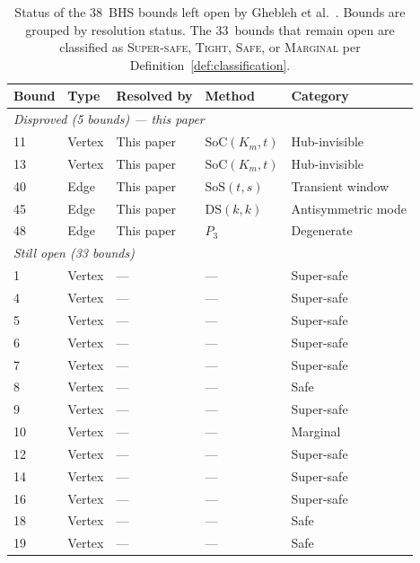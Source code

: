\documentclass[preprint,12pt]{elsarticle}
\theoremstyle{definition}
\theoremstyle{remark}
\newcommand{\SoC}{\mathrm{SoC}}       %
\newcommand{\SoS}{\mathrm{SoS}}       %
\newcommand{\DS}{\mathrm{DS}}          %
\begin{document}
\begin{table}[ht]
  \centering
  \caption{Status of the 38~BHS bounds left open by Ghebleh et
    al.~\cite{Ghebleh2024}.
    Bounds are grouped by resolution status.
    The 33~bounds that remain open are classified as
    \textsc{Super-safe}, \textsc{Tight}, \textsc{Safe}, or
    \textsc{Marginal} per Definition~\ref{def:classification}.}
  \label{tab:classification}
  {\small\renewcommand{\arraystretch}{0.88}%
  \begin{tabular}{lllll}
    \toprule
    Bound & Type & Resolved by & Method & Category \\
    \midrule
    \multicolumn{5}{l}{\emph{Disproved (5 bounds) --- this paper}} \\
    11  & Vertex & This paper & $\SoC(K_m, t)$    & Hub-invisible \\
    13  & Vertex & This paper & $\SoC(K_m, t)$    & Hub-invisible \\
    40  & Edge   & This paper & $\SoS(t, s)$      & Transient window \\
    45  & Edge   & This paper & $\DS(k, k)$       & Antisymmetric mode \\
    48  & Edge   & This paper & $P_3$             & Degenerate \\
    \midrule
    \multicolumn{5}{l}{\emph{Still open (33 bounds)}} \\
    1   & Vertex & ---         & --- & Super-safe \\
    4   & Vertex & ---         & --- & Super-safe \\
    5   & Vertex & ---         & --- & Super-safe \\
    6   & Vertex & ---         & --- & Super-safe \\
    7   & Vertex & ---         & --- & Super-safe \\
    8   & Vertex & ---         & --- & Safe \\
    9   & Vertex & ---         & --- & Super-safe \\
    10  & Vertex & ---         & --- & Marginal \\
    12  & Vertex & ---         & --- & Super-safe \\
    14  & Vertex & ---         & --- & Super-safe \\
    16  & Vertex & ---         & --- & Super-safe \\
    18  & Vertex & ---         & --- & Safe \\
    19  & Vertex & ---         & --- & Safe \\

\end{tabular}}
\end{table}
\end{document}
